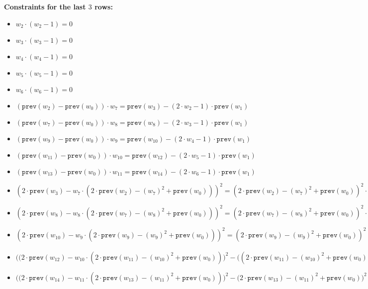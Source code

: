 \textbf{Constraints for the last $3$ rows:}
\begin{itemize}
    \item $w_2 \cdot (w_2 - 1) = 0$
    \item $w_3 \cdot (w_3 - 1) = 0$
    \item $w_4 \cdot (w_4 - 1) = 0$
    \item $w_5 \cdot (w_5 - 1) = 0$
    \item $w_6 \cdot (w_6 - 1) = 0$ \\

    \item $(\texttt{prev}(w_{2}) - \texttt{prev}(w_{0})) \cdot w_7 = \texttt{prev}(w_3) - (2 \cdot w_{2} - 1) \cdot \texttt{prev}(w_1)$
    \item $(\texttt{prev}(w_{7}) - \texttt{prev}(w_{0})) \cdot w_8 = \texttt{prev}(w_8) - (2 \cdot w_{3} - 1) \cdot \texttt{prev}(w_1)$
    \item $(\texttt{prev}(w_{9}) - \texttt{prev}(w_{0})) \cdot w_9 = \texttt{prev}(w_{10}) - (2 \cdot w_{4} - 1) \cdot \texttt{prev}(w_1)$
    \item $(\texttt{prev}(w_{11}) - \texttt{prev}(w_{0})) \cdot w_{10} = \texttt{prev}(w_{12}) - (2 \cdot w_{5} - 1) \cdot \texttt{prev}(w_1)$
    \item $(\texttt{prev}(w_{13}) - \texttt{prev}(w_{0})) \cdot w_{11} = \texttt{prev}(w_{14}) - (2 \cdot w_{6} - 1) \cdot \texttt{prev}(w_1)$ \\


    \item $(2\cdot \texttt{prev}(w_{3}) - w_7 \cdot (2 \cdot \texttt{prev}(w_2) - (w_7)^2 + \texttt{prev}(w_{0})))^2           =  (2 \cdot \texttt{prev}(w_2) - (w_7)^2 + \texttt{prev}(w_{0}))^2 \cdot (\texttt{prev}(w_7) - \texttt{prev}(w_0) + (w_7)^2)$
    \item $(2\cdot \texttt{prev}(w_{8}) - w_8 \cdot (2 \cdot \texttt{prev}(w_7) - (w_8)^2 + \texttt{prev}(w_{0})))^2           =  (2 \cdot \texttt{prev}(w_7) - (w_8)^2 + \texttt{prev}(w_{0}))^2 \cdot (\texttt{prev}(w_9) - \texttt{prev}(w_0) + (w_8)^2)$
    \item $(2\cdot \texttt{prev}(w_{10}) - w_9 \cdot (2 \cdot \texttt{prev}(w_9) - (w_9)^2 + \texttt{prev}(w_{0})))^2          =  (2 \cdot \texttt{prev}(w_9) - (w_9)^2 + \texttt{prev}(w_{0}))^2 \cdot (\texttt{prev}(w_{11}) - \texttt{prev}(w_0) + (w_9)^2)$
    \item $\biggl( \bigl(2\cdot \texttt{prev}(w_{12}) - w_{10} \cdot (2 \cdot \texttt{prev}(w_{11}) - (w_{10})^2 + \texttt{prev}(w_{0}))\bigr)^2 - \bigl((2 \cdot \texttt{prev}(w_{11}) - (w_{10})^2 + \texttt{prev}(w_{0}))^2 \cdot (\texttt{prev}(w_{13}) - \texttt{prev}(w_0) + (w_{10})^2)\bigr)\biggr) \cdot (\texttt{next}(w_8) \cdot \texttt{next}(w_2)) = 0$
    \item $\biggl( \bigl(2\cdot \texttt{prev}(w_{14}) - w_{11} \cdot (2 \cdot \texttt{prev}(w_{13}) - (w_{11})^2 + \texttt{prev}(w_{0}))\bigr)^2 - \bigl(2 \cdot \texttt{prev}(w_{13}) - (w_{11})^2 + \texttt{prev}(w_{0}))^2 \cdot (w_0 - \texttt{prev}(w_0) + (w_{11})^2)\bigr) \biggr) \cdot (\texttt{next}(w_8) \cdot \texttt{next}(w_2)) = 0$\\


\end{itemize}
